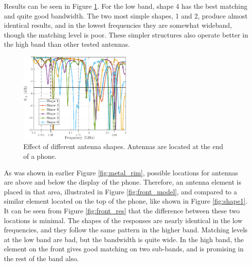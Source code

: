 Results can be seen in Figure \ref{fig:shape}. For the low band, shape 4 has the best matching and quite good bandwidth. The two most simple shapes, 1 and 2, produce almost identical results, and in the lowest frequencies they are somewhat wideband, though the matching level is poor. These simpler structures also operate better in the high band than other tested antennas.

\begin{figure}[H]
    \centering
    \includegraphics[width=0.5\textwidth]{img/shape.eps}
    \caption{Effect of different antenna shapes. Antennas are located at the end of a phone.}
    \label{fig:shape}
\end{figure}


As was shown in earlier Figure \ref{fig:metal_rim}, possible locations for antennas are above and below the display of the phone. Therefore, an antenna element is placed in that area, illustrated in Figure \ref{fig:front_model}, and compared to a similar element located on the top of the phone, like shown in Figure \ref{fig:shape1}. It can be seen from Figure \ref{fig:front_res} that the difference between these two locations is minimal. The shapes of the responses are nearly identical in the low frequencies, and they follow the same pattern in the higher band. Matching levels at the low band are bad, but the bandwidth is quite wide. In the high band, the element on the front gives good matching on two sub-bands, and is promising in the rest of the band also.

